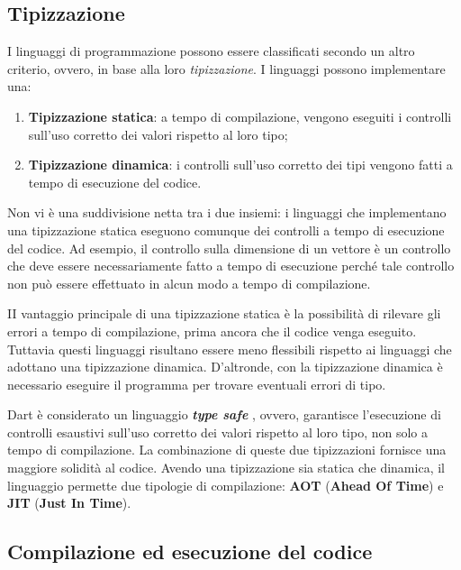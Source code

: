 \subsection{Tipizzazione}
I linguaggi di programmazione possono essere classificati secondo un altro criterio, ovvero, in base alla loro \textit{tipizzazione}. I linguaggi possono implementare una:
\begin{enumerate}
	\item \textbf{Tipizzazione statica}: a tempo di compilazione, vengono eseguiti i controlli sull'uso corretto dei valori rispetto al loro tipo;
	\item \textbf{Tipizzazione dinamica}: i controlli sull'uso corretto dei tipi vengono fatti a tempo di esecuzione del codice.
\end{enumerate}

Non vi è una suddivisione netta tra i due insiemi: i linguaggi che implementano una tipizzazione statica eseguono comunque dei controlli a tempo di esecuzione del codice. Ad esempio, il controllo sulla dimensione di un vettore è un controllo che deve essere necessariamente fatto a tempo di esecuzione perché tale controllo non può essere effettuato in alcun modo a tempo di compilazione.

II vantaggio principale di una tipizzazione statica è la possibilità di rilevare gli errori a tempo di compilazione, prima ancora che il codice venga eseguito. Tuttavia questi linguaggi risultano essere meno flessibili rispetto ai linguaggi che adottano una tipizzazione dinamica. D'altronde, con la tipizzazione dinamica è necessario eseguire il programma per trovare eventuali errori di tipo.

Dart è considerato un linguaggio \textbf{\textit{type safe}} \cite{tipizzazione}, ovvero, garantisce l'esecuzione di controlli esaustivi sull'uso corretto dei valori rispetto al loro tipo, non solo a tempo di compilazione. La combinazione di queste due tipizzazioni fornisce una maggiore solidità al codice. Avendo una tipizzazione sia statica che dinamica, il linguaggio permette due tipologie di compilazione: \textbf{AOT} (\textbf{Ahead Of Time}) e \textbf{JIT} (\textbf{Just In Time}).

\subsection{Compilazione ed esecuzione del codice}
